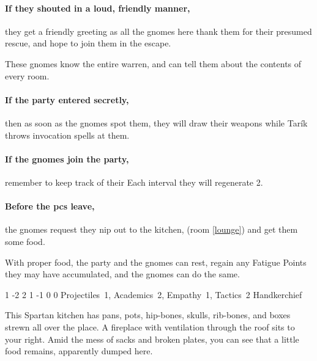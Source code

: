 \begin{multicols}{2}
\paragraph{If they shouted in a loud, friendly manner,}
they get a friendly greeting as all the gnomes here thank them for their presumed rescue, and hope to join them in the escape.

These gnomes know the entire warren, and can tell them about the contents of every room.

\paragraph{If the party entered secretly,}
then as soon as the gnomes spot them, they will draw their weapons while Tar\'ik throws invocation spells at them.

\paragraph{If the gnomes join the party,}
remember to keep track of their 
Each \gls{interval} they will regenerate 2.

\paragraph{Before the \glspl{pc} leave,}
the gnomes request they nip out to the kitchen, (room \ref{lounge}) and get them some food.

With proper food, the party and the gnomes can rest, regain any Fatigue Points they may have accumulated, and the gnomes can do the same.




{1}%
{-2}%
{{2}%
{1}%
{-1}}%
{0}%
{0}%
{Projectiles~1, Academics~2, Empathy~1, Tactics~2}%
{Handkerchief}%
{
  \setcounter{Fire}{2}
  \setcounter{Air}{2}
}

\begin{boxtext}

  This Spartan kitchen has pans, pots, hip-bones, skulls, rib-bones, and boxes strewn all over the place.
  A fireplace with ventilation through the roof sits to your right.
  Amid the mess of sacks and broken plates, you can see that a little food remains, apparently dumped here.


\end{boxtext}
\end{multicols}
